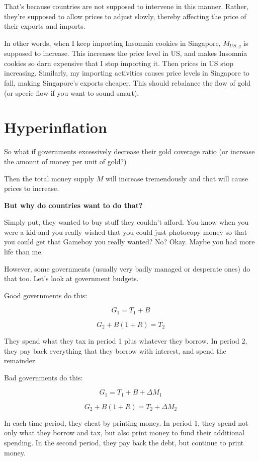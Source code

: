 \documentclass[11pt]{scrartcl}
\begin{document}
That's because countries are not supposed to intervene in this manner. Rather, they're supposed to allow prices to adjust slowly, thereby affecting the price of their exports and imports.

In other words, when I keep importing Insomnia cookies in Singapore, $M_{US,g}$ is supposed to increase. This increases the price level in US, and makes Insomnia cookies so darn expensive that I stop importing it. Then prices in US stop increasing. Similarly, my importing activities causes price levels in Singapore to fall, making Singapore's exports cheaper. This should rebalance the flow of gold (or specie flow if you want to sound smart).

\section{Hyperinflation}

So what if governments excessively decrease their gold coverage ratio (or increase the amount of money per unit of gold?)

Then the total money supply $M$ will increase tremendously and that will cause prices to increase.

\textbf{But why do countries want to do that?}

Simply put, they wanted to buy stuff they couldn't afford. You know when you were a kid and you really wished that you could just photocopy money so that you could get that Gameboy you really wanted? No? Okay. Maybe you had more life than me.

However, some governments (usually very badly managed or desperate ones) do that too. Let's look at government budgets. 

Good governments do this:

\[ G_1 = T_1 + B \]

\[ G_2 + B(1+R) = T_2 \]

They spend what they tax in period 1 plus whatever they borrow. In period 2, they pay back everything that they borrow with interest, and spend the remainder.

Bad governments do this:

\[ G_1 = T_1 + B + \Delta M_1 \]

\[ G_2 + B(1+R) = T_2 + \Delta M_2\]

In each time period, they cheat by printing money. In period 1, they spend not only what they borrow and tax, but also print money to fund their additional spending. In the second period, they pay back the debt, but continue to print money. 
\end{document}
